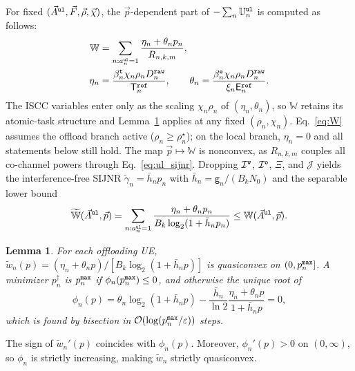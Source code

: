 \documentclass[journal]{IEEEtran}
\newtheorem{lemma}{Lemma}
\begin{document}
For fixed $(\vec{A}^{\tt ul},\vec{F},\vec{\rho},\vec{\chi})$, the $\vec{p}$-dependent part of $-\sum_n\mathbb{U}_n^{\tt ul}$ is computed as follows:
\begin{align}
\mathbb{W}
&=\sum_{n:a_n^{\tt ul}=1}
\frac{\eta_n+\theta_n p_n}{R_{n,k,m}},
\label{eq:W}\\
\eta_n&=\frac{\beta_n^{\tt t}\chi_n\rho_n D_n^{\tt raw}}{\mathsf{T}_n^{\tt ref}},
\qquad
\theta_n=\frac{\beta_n^{\tt e}\chi_n\rho_n D_n^{\tt raw}}{\xi_n\mathsf{E}_n^{\tt ref}}.
\nonumber
\end{align}
The ISCC variables enter only as the scaling $\chi_n\rho_n$ of $(\eta_n,\theta_n)$, so $\mathbb{W}$ retains its atomic-task structure and Lemma~\ref{lem:quasi} applies at any fixed $(\rho_n,\chi_n)$. Eq.~\eqref{eq:W} assumes the offload branch active ($\rho_n\ge\rho_n^\star$); on the local branch, $\eta_n=0$ and all statements below still hold.
The map $\vec{p}\mapsto\mathbb{W}$ is nonconvex, as $R_{n,k,m}$ couples all co-channel powers through Eq.~\eqref{eq:ul_sijnr}. Dropping $\mathcal{I}^{\tt w}$, $\mathcal{I}^{\tt o}$, $\Xi$, and $\mathcal{J}$ yields the interference-free SIJNR $\tilde\gamma_{n}= \bar h_n p_n$ with $\bar h_n=\mathsf{g}_n/(B_k N_0)$ and the separable lower bound
\begin{equation}
\widetilde{\mathbb{W}}(\vec{A}^{\tt ul},\vec{p})
=\sum_{n:a_n^{\tt ul}=1}
\frac{\eta_n+\theta_n p_n}{B_k\log_2(1+\bar h_n p_n)}
\le \mathbb{W}(\vec{A}^{\tt ul},\vec{p}).
\label{eq:Wtil}
\end{equation}

\begin{lemma}\label{lem:quasi}
For each offloading UE, ${\tilde{w}}_n(p)=(\eta_n+\theta_n p)/[B_k\log_2(1+\bar h_n p)]$ is quasiconvex on $(0,p_n^{\tt max}]$. A minimizer $p_n^\dagger$ is $p_n^{\tt max}$ if $\phi_n(p_n^{\tt max})\le 0$, and otherwise the unique root of
\begin{equation}
\phi_n(p)
=\theta_n\log_2(1+\bar h_n p)
-\frac{\bar h_n}{\ln 2}\frac{\eta_n+\theta_n p}{1+\bar h_n p}=0,
\label{eq:phi}
\end{equation}
which is found by bisection in $\mathcal{O}(\log(p_n^{\tt max}/\varepsilon))$ steps.
\end{lemma}
\begin{IEEEproof}
The sign of $\tilde{w}_n'(p)$ coincides with $\phi_n(p)$. 
{Moreover, $\phi_n'(p)>0$ on $(0,\infty)$, so $\phi_n$ is strictly increasing, making $\tilde{w}_n$ strictly quasiconvex.}
\end{IEEEproof}
\end{document}
